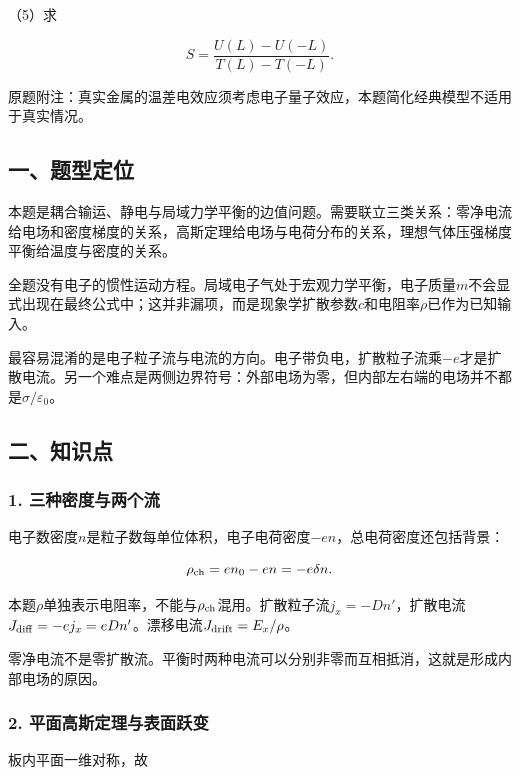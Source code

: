 \documentclass[12pt,a4paper,fontset=fandol]{ctexart}
\begin{document}
（5）求

\[
S=\frac{U(L)-U(-L)}{T(L)-T(-L)}.
\]

原题附注：真实金属的温差电效应须考虑电子量子效应，本题简化经典模型不适用于真实情况。

\subsection{一、题型定位}\label{ux4e00ux9898ux578bux5b9aux4f4d-5}

本题是耦合输运、静电与局域力学平衡的边值问题。需要联立三类关系：零净电流给电场和密度梯度的关系，高斯定理给电场与电荷分布的关系，理想气体压强梯度平衡给温度与密度的关系。

全题没有电子的惯性运动方程。局域电子气处于宏观力学平衡，电子质量\(m\)不会显式出现在最终公式中；这并非漏项，而是现象学扩散参数\(c\)和电阻率\(\rho\)已作为已知输入。

最容易混淆的是电子粒子流与电流的方向。电子带负电，扩散粒子流乘\(-e\)才是扩散电流。另一个难点是两侧边界符号：外部电场为零，但内部左右端的电场并不都是\(\sigma/\varepsilon_0\)。

\subsection{二、知识点}\label{ux4e8cux77e5ux8bc6ux70b9-5}

\subsubsection{1.
三种密度与两个流}\label{ux4e09ux79cdux5bc6ux5ea6ux4e0eux4e24ux4e2aux6d41}

电子数密度\(n\)是粒子数每单位体积，电子电荷密度\(-en\)，总电荷密度还包括背景：

\[
\rho_{\rm ch}=en_0-en=-e\delta n.
\]

本题\(\rho\)单独表示电阻率，不能与\(\rho_{\rm ch}\)混用。扩散粒子流\(j_x=-Dn'\)，扩散电流\(J_{\rm diff}=-ej_x=eDn'\)。漂移电流\(J_{\rm drift}=E_x/\rho\)。

零净电流不是零扩散流。平衡时两种电流可以分别非零而互相抵消，这就是形成内部电场的原因。

\subsubsection{2.
平面高斯定理与表面跃变}\label{ux5e73ux9762ux9ad8ux65afux5b9aux7406ux4e0eux8868ux9762ux8dc3ux53d8}

板内平面一维对称，故
\end{document}
